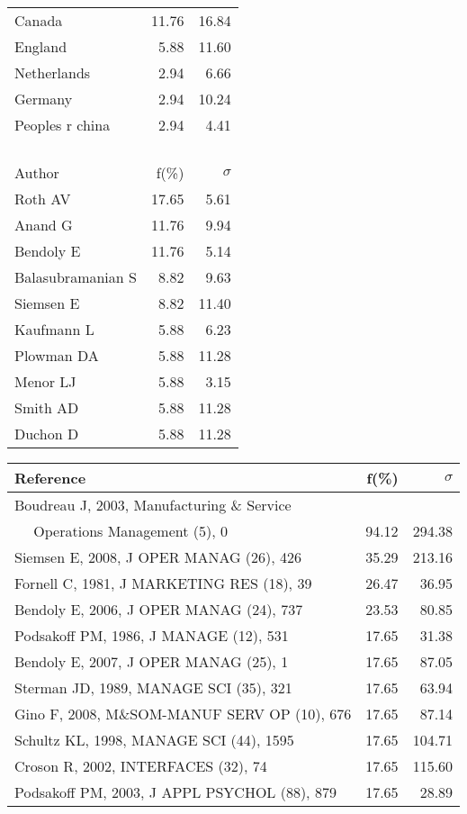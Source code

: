 \documentclass[a4paper,11pt]{report}
\begin{document}
\begin{landscape}
\begin{table}[!ht]
{\begin{tabular}{|l r r|}
Canada & 11.76 & 16.84\\
England & 5.88 & 11.60\\
Netherlands & 2.94 & 6.66\\
Germany & 2.94 & 10.24\\
Peoples r china & 2.94 & 4.41\\
 &  & \\
 &  & \\
 &  & \\
 &  & \\
\hline
\hline
Author & f(\%) & $\sigma$\\
\hline
Roth AV & 17.65 & 5.61\\
Anand G & 11.76 & 9.94\\
Bendoly E & 11.76 & 5.14\\
Balasubramanian S & 8.82 & 9.63\\
Siemsen E & 8.82 & 11.40\\
Kaufmann L & 5.88 & 6.23\\
Plowman DA & 5.88 & 11.28\\
Menor LJ & 5.88 & 3.15\\
Smith AD & 5.88 & 11.28\\
Duchon D & 5.88 & 11.28\\
\hline
\end{tabular}
}
{\scriptsize\begin{tabular}{|l r r|}
\hline
Reference & f(\%) & $\sigma$\\
\hline
Boudreau J, 2003, Manufacturing \& Service &  & \\
$\quad$ Operations Management (5), 0 & 94.12 & 294.38\\
Siemsen E, 2008, J OPER MANAG (26), 426 & 35.29 & 213.16\\
Fornell C, 1981, J MARKETING RES (18), 39 & 26.47 & 36.95\\
Bendoly E, 2006, J OPER MANAG (24), 737 & 23.53 & 80.85\\
Podsakoff PM, 1986, J MANAGE (12), 531 & 17.65 & 31.38\\
Bendoly E, 2007, J OPER MANAG (25), 1 & 17.65 & 87.05\\
Sterman JD, 1989, MANAGE SCI (35), 321 & 17.65 & 63.94\\
Gino F, 2008, M\&SOM-MANUF SERV OP (10), 676 & 17.65 & 87.14\\
Schultz KL, 1998, MANAGE SCI (44), 1595 & 17.65 & 104.71\\
Croson R, 2002, INTERFACES (32), 74 & 17.65 & 115.60\\
Podsakoff PM, 2003, J APPL PSYCHOL (88), 879 & 17.65 & 28.89\\

\end{tabular}}
\end{table}
\end{landscape}
\end{document}
